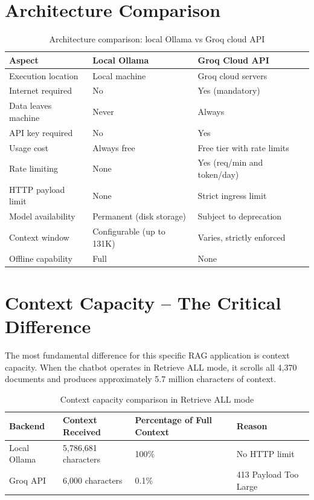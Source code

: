 \documentclass[12pt,a4paper]{report}
\begin{document}
\section{Architecture Comparison}

\begin{table}[H]
\centering
\begin{tabularx}{\textwidth}{lXX}
\toprule
\textbf{Aspect} & \textbf{Local Ollama} & \textbf{Groq Cloud API} \\
\midrule
Execution location & Local machine & Groq cloud servers \\
Internet required & No & Yes (mandatory) \\
Data leaves machine & Never & Always \\
API key required & No & Yes \\
Usage cost & Always free & Free tier with rate limits \\
Rate limiting & None & Yes (req/min and token/day) \\
HTTP payload limit & None & Strict ingress limit \\
Model availability & Permanent (disk storage) & Subject to deprecation \\
Context window & Configurable (up to 131K) & Varies, strictly enforced \\
Offline capability & Full & None \\
\bottomrule
\end{tabularx}
\caption{Architecture comparison: local Ollama vs Groq cloud API}
\label{tab:arch_compare}
\end{table}

\section{Context Capacity -- The Critical Difference}

The most fundamental difference for this specific RAG application is context capacity. When the chatbot operates in Retrieve ALL mode, it scrolls all 4,370 documents and produces approximately 5.7 million characters of context.

\begin{table}[H]
\centering
\begin{tabular}{llll}
\toprule
\textbf{Backend} & \textbf{Context Received} & \textbf{Percentage of Full Context} & \textbf{Reason} \\
\midrule
Local Ollama & 5,786,681 characters & 100\% & No HTTP limit \\
Groq API & 6,000 characters & 0.1\% & 413 Payload Too Large \\
\bottomrule
\end{tabular}
\caption{Context capacity comparison in Retrieve ALL mode}
\label{tab:context_compare}
\end{table}
\end{document}

